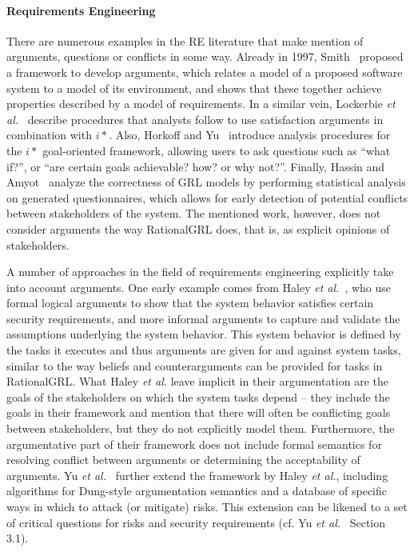 \paragraph{Requirements Engineering} 
There are numerous examples in the RE literature that make mention of arguments, questions or conflicts in some way. Already in 1997, Smith~\cite{Smith:1997:CRF:2737426.2737493} proposed a framework to develop arguments, which relates a model of a proposed software system to a model of its environment, and shows that these together achieve properties described by a model of requirements. In a similar vein, Lockerbie \emph{et al.}~\cite{lockerbie2012exploring} describe procedures that analysts follow to use satisfaction arguments in combination with $i*$. Also, Horkoff and Yu~\cite{horkoff2016interactive} introduce analysis procedures for the $i*$ goal-oriented framework, allowing users to ask questions such as ``what if?'', or ``are certain goals achievable? how? or why not?''. Finally, Hassin and Amyot~\cite{hassine2016questionnaire} analyze the correctness of GRL models by performing statistical analysis on generated questionnaires, which allows for early detection of potential conflicts between stakeholders of the system. The mentioned work, however, does not consider arguments the way RationalGRL does, that is, as explicit opinions of stakeholders. 

A number of approaches in the field of requirements engineering explicitly take into account arguments. One early example comes from Haley \emph{et al.}~\cite{haley2008security}, who use formal logical arguments to show that the system behavior satisfies certain security requirements, and more informal arguments to capture and validate the assumptions underlying the system behavior. This system behavior is defined by the tasks it executes and thus arguments are given for and against system tasks, similar to the way beliefs and counterarguments can be provided for tasks in RationalGRL. What Haley \emph{et al.} leave implicit in their argumentation are the goals of the stakeholders on which the system tasks depend -- they include the goals in their framework and mention that there will often be conflicting goals between stakeholders, but they do not explicitly model them. Furthermore, the argumentative part of their framework does not include formal semantics for resolving conflict between arguments or determining the acceptability of arguments. Yu \emph{et al.}~\cite{yu2015automated} further extend the framework by Haley \emph{et al.}, including algorithms for Dung-style argumentation semantics \cite{Dung1995} and a database of specific ways in which to attack (or mitigate) risks. This extension can be likened to a set of critical questions for risks and security requirements (cf. Yu \emph{et al.}~\cite{yu2015automated} Section 3.1).

